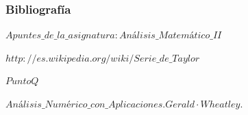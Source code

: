 \documentclass{beamer}
\begin{document}
\begin{frame}
\frametitle{Bibliografía}
\begin{thebibliography}

  \beamertermplatebookbibitems
  {\small $Apuntes\_de\_la\_asignatura: Análisis\_Matemático\_II$}
  
  \beamertermplatebookbibitems
  {\small $http://es.wikipedia.org/wiki/Serie\_de\_Taylor$}
  
  
  \beamertermplatebookbibitems
  {\small $PuntoQ$}
  

  \beamertermplatebookbibitems
  {\small $Análisis\_Numérico\_con\_Aplicaciones. Gerald·Wheatley.$}
  
\end{thebibliography}
\end{frame}
\end{document}
